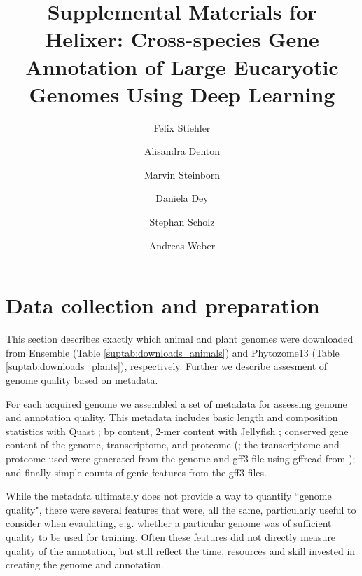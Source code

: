\documentclass{article}
\begin{document}
\title{Supplemental Materials for \\ Helixer: Cross-species Gene Annotation of Large Eucaryotic Genomes Using Deep Learning}

\author[1]{Felix Stiehler}
\author[1]{Alisandra Denton}
\author[1]{Marvin Steinborn}
\author[ \hspace{-1ex}]{Daniela Dey}
\author[ \hspace{-1ex}]{Stephan Scholz}
\author[1]{Andreas Weber}


\date{}
\maketitle
\tableofcontents

\newpage
\section{Data collection and preparation}
\label{ssec:data_prep}
This section describes exactly which animal and plant genomes were downloaded
from Ensemble (Table \ref{suptab:downloads_animals}) and 
Phytozome13 (Table \ref{suptab:downloads_plants}), respectively.
Further we describe assesment of genome quality based on metadata. 

For each acquired genome we assembled a set of metadata for assessing 
genome and annotation quality. 
This metadata includes basic length and 
composition statistics with Quast \citep{gurevich2013quast}; 
bp content, 2-mer content with Jellyfish \citep{marccais2011fast};
conserved gene content of the genome, transcriptome, and proteome (\cite{simao2015busco};
the transcriptome and proteome used were generated from the genome and gff3 file 
using gffread from \cite{trapnell2012differential}); 
and finally simple counts of genic features from the gff3 files.

While the metadata ultimately does not provide a way to quantify ``genome quality",
there were several features that were, all the same, particularly useful to consider
when evaulating, e.g. whether a particular genome was of sufficient quality to be
used for training. Often these features did not directly measure quality of
the annotation, but still reflect the time, resources and skill invested in
creating the genome and annotation. 
\end{document}
